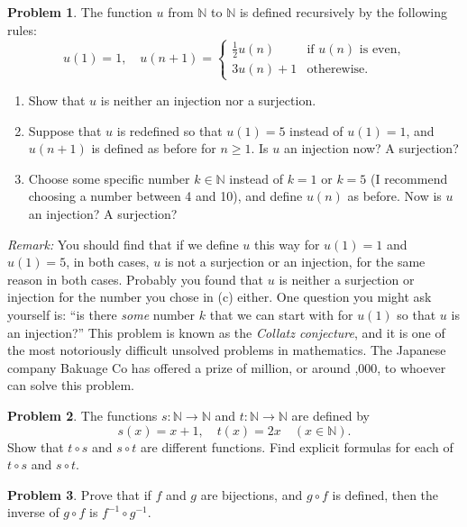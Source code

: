 \documentclass{article}
\numberwithin{equation}{section}
\theoremstyle{plain}
\theoremstyle{definition}
\newtheorem{problem}{Problem}
\newcommand{\N}{\mathbb N}
\begin{document}
\begin{problem}
	The function $u$ from $\N$ to $\N$ is defined recursively by the following rules: \[
	u(1) = 1, \quad u(n+1)= \begin{cases}
	\frac 1 2 u(n) & \textrm{if $u(n)$ is even,} \\
	3u(n)+1 & \textrm{otherewise.}
	\end{cases}
	\]
	\begin{enumerate}[label=(\alph*)]
			\item Show that $u$ is neither an injection nor a surjection. 
			\item Suppose that $u$ is redefined so that $u(1) = 5$ instead of $u(1) = 1$, and $u(n+1)$ is defined as before for $n \geq 1$. Is $u$ an injection now? A surjection? 
			\item Choose some specific number $k \in \N$ instead of $k=1$ or $k=5$ (I recommend choosing a number between 4 and 10), and define $u(n)$ as before. Now is $u$ an injection? A surjection?
	\end{enumerate} 
	
	\emph{Remark:} You should find that if we define $u$ this way for $u(1) = 1$ and $u(1) = 5$, in both cases, $u$ is not a surjection or an injection, for the same reason in both cases. Probably you found that $u$ is neither a surjection or injection for the number you chose in (c) either. One question you might ask yourself is: ``is there \emph{some} number $k$ that we can start with for $u(1)$ so that $u$ is an injection?'' This problem is known as the \emph{Collatz conjecture}, and it is one of the most notoriously difficult unsolved problems in mathematics. The Japanese company Bakuage Co has offered a prize of  million, or around ,000, to whoever can solve this problem. 
\end{problem}

\begin{problem}
	The functions $s : \N \to \N$ and $t : \N \to \N$ are defined by \[
	s(x) = x+1, \quad t(x) = 2x \quad (x \in \N).
	\]
	Show that $t \circ s$ and $s \circ t$ are different functions. Find explicit formulas for each of $t \circ s$ and $s \circ t$. 
\end{problem}

\begin{problem}
	Prove that if $f$ and $g$ are bijections, and $g \circ f$ is defined, then the inverse of $g \circ f$ is $f^{-1} \circ g^{-1}$. 
\end{problem}
\end{document}
